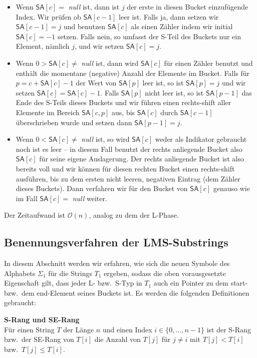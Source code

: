 \begin{itemize}
\item Wenn $\mathsf{SA}[c] = $ \textit{null} ist, dann ist $j$ der erste in diesen Bucket einzufügende Index. Wir prüfen ob $\mathsf{SA}[c-1]$ leer ist. Falls ja, dann setzen wir $\mathsf{SA}[c-1] = j$ und benutzen $\mathsf{SA}[c]$ als einen Zähler indem wir initial $\mathsf{SA}[c] = -1$ setzen. Falls nein, so umfasst der S-Teil des Buckets nur ein Element, nämlich $j$, und wir setzen $\mathsf{SA}[c] = j$.
\item Wenn $ 0 > \mathsf{SA}[c] \neq$ \textit{null} ist, dann wird $\mathsf{SA}[c]$ für einen Zähler benutzt und enthält die momentane (negative) Anzahl der Elemente im Bucket. Falls für $p = c + \mathsf{SA}[c] - 1$ der Wert von $\mathsf{SA}[p]$ leer ist, so ist $\mathsf{SA}[p] = j$ und wir setzen $\mathsf{SA}[c] = \mathsf{SA}[c] - 1$. Falls $\mathsf{SA}[p]$ nicht leer ist, so ist $\mathsf{SA}[p-1]$ das Ende des S-Teils dieses Buckets und wir führen einen rechts-shift aller Elemente im Bereich $\mathsf{SA}[c, p]$ aus, bis $\mathsf{SA}[c]$ durch $\mathsf{SA}[c-1]$ überschrieben wurde und setzen dann $\mathsf{SA}[p-1] = j$.
\item Wenn $ 0 < \mathsf{SA}[c] \neq$ \textit{null} ist, so wird $\mathsf{SA}[c]$ weder als Indikator gebraucht noch ist es leer -- in diesem Fall benutzt der rechts anliegende Bucket also $\mathsf{SA}[c]$ für seine eigene Auslagerung. Der rechts anliegende Bucket ist also bereits voll und wir können für diesen rechten Bucket einen rechts-shift ausführen, bis zu dem ersten nicht leeren, negativen Eintrag (dem Zähler dieses Buckets). Dann verfahren wir für den Bucket von $\mathsf{SA}[c]$ genauso wie im Fall $\mathsf{SA}[c] = $ \textit{null} weiter.
\end{itemize}

Der Zeitaufwand ist $\mathcal O(n)$, analog zu dem der L-Phase.

\subsection{ Benennungsverfahren der LMS-Substrings}

In diesem Abschnitt werden wir erfahren, wie sich die neuen Symbole des Alphabets $\Sigma_1$ für die Strings $T_1$ ergeben, sodass die oben vorausgesetzte Eigenschaft gilt, dass jeder L- bzw.\ S-Typ in $T_1$ auch ein Pointer zu dem start- bzw.\ dem end-Element seines Buckets ist. Es werden die folgenden Definitionen gebraucht:

\begin{definition}\textbf{S-Rang und SE-Rang}\\
Für einen String $T$ der Länge $n$ und einen Index $i \in \{0, \ldots, n-1\}$ ist der S-Rang bzw.\ der SE-Rang von $T[i]$ die Anzahl von $T[j]$ für $j \neq i$ mit $T[j] < T[i]$ bzw.\ $T[j] \leq T[i]$. 
\end{definition}


